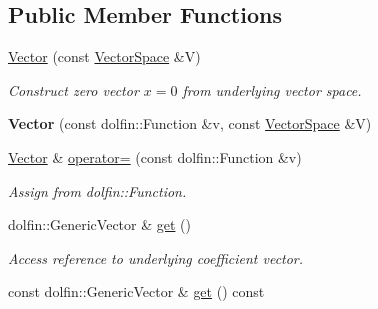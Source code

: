 \subsection*{\-Public \-Member \-Functions}
\begin{DoxyCompactItemize}
\item 
\hypertarget{classSpacy_1_1FEniCS_1_1Vector_af6ea1ceb6c0b01cf10b3ab9caa6f1eda}{\hyperlink{classSpacy_1_1FEniCS_1_1Vector_af6ea1ceb6c0b01cf10b3ab9caa6f1eda}{\-Vector} (const \hyperlink{classSpacy_1_1VectorSpace}{\-Vector\-Space} \&\-V)}\label{classSpacy_1_1FEniCS_1_1Vector_af6ea1ceb6c0b01cf10b3ab9caa6f1eda}

\begin{DoxyCompactList}\small\item\em \-Construct zero vector $x=0$ from underlying vector space. \end{DoxyCompactList}\item 
\hypertarget{classSpacy_1_1FEniCS_1_1Vector_a2c13b8edce95768e3710ae97a4466242}{{\bfseries \-Vector} (const dolfin\-::\-Function \&v, const \hyperlink{classSpacy_1_1VectorSpace}{\-Vector\-Space} \&\-V)}\label{classSpacy_1_1FEniCS_1_1Vector_a2c13b8edce95768e3710ae97a4466242}

\item 
\hypertarget{classSpacy_1_1FEniCS_1_1Vector_ad4d68b813d9374aa83f37ec2b3ad02fc}{\hyperlink{classSpacy_1_1FEniCS_1_1Vector}{\-Vector} \& \hyperlink{classSpacy_1_1FEniCS_1_1Vector_ad4d68b813d9374aa83f37ec2b3ad02fc}{operator=} (const dolfin\-::\-Function \&v)}\label{classSpacy_1_1FEniCS_1_1Vector_ad4d68b813d9374aa83f37ec2b3ad02fc}

\begin{DoxyCompactList}\small\item\em \-Assign from dolfin\-::\-Function. \end{DoxyCompactList}\item 
\hypertarget{classSpacy_1_1FEniCS_1_1Vector_afadf508451c68fd767da6a1be4852fed}{dolfin\-::\-Generic\-Vector \& \hyperlink{classSpacy_1_1FEniCS_1_1Vector_afadf508451c68fd767da6a1be4852fed}{get} ()}\label{classSpacy_1_1FEniCS_1_1Vector_afadf508451c68fd767da6a1be4852fed}

\begin{DoxyCompactList}\small\item\em \-Access reference to underlying coefficient vector. \end{DoxyCompactList}\item 
\hypertarget{classSpacy_1_1FEniCS_1_1Vector_ac69fe18ef6818182186f9db82da0f7e2}{const dolfin\-::\-Generic\-Vector \& \hyperlink{classSpacy_1_1FEniCS_1_1Vector_ac69fe18ef6818182186f9db82da0f7e2}{get} () const }\label{classSpacy_1_1FEniCS_1_1Vector_ac69fe18ef6818182186f9db82da0f7e2}


\end{DoxyCompactItemize}
